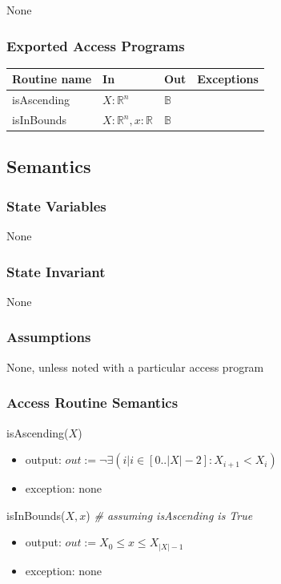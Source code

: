 \documentclass[12pt, titlepage]{article}
\begin{document}
None

\subsubsection* {Exported Access Programs}

\begin{tabular}{| l | l | l | l |}
\hline
\textbf{Routine name} & \textbf{In} & \textbf{Out} & \textbf{Exceptions}\\
\hline
isAscending & $X: \mathbb{R}^n$ & $\mathbb{B}$ & ~\\
\hline
isInBounds & $X: \mathbb{R}^n, x: \mathbb{R}$ & $\mathbb{B}$ & ~\\
\hline
\end{tabular}

\subsection* {Semantics}

\subsubsection* {State Variables}

None

\subsubsection* {State Invariant}

None

\subsubsection* {Assumptions}

None, unless noted with a particular access program

\subsubsection* {Access Routine Semantics}

\noindent isAscending($X$)
\begin{itemize}
\item output: $out := \neg \exists(i | i \in [0..|X|-2] : X_{i+1} < X_i)$
\item exception: none
\end{itemize}

\noindent isInBounds($X, x$) \textit{\# assuming isAscending is True}
\begin{itemize}
\item output: $out := X_0 \leq x \leq X_{|X|-1}$
\item exception: none
\end{itemize}
\end{document}
